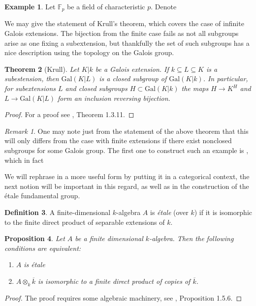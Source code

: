 \documentclass{article}
\newtheorem{theorem}{Theorem}[section]
\theoremstyle{definition}
\newtheorem{definition}[theorem]{Definition}
\newtheorem{example}[theorem]{Example}
\theoremstyle{remark}
\newtheorem*{remark}{Remark}
\theoremstyle{plain}
\newtheorem{proposition}[theorem]{Proposition}
\begin{document}
\begin{example}
	Let $\mathbb{F}_p$ be a field of characteristic $p$.
	Denote 

\end{example}
We may give the statement of Krull's theorem, which covers the case of infinite Galois extensions.
The bijection from the finite case fails as not all subgroups arise as one fixing a subextension, but thankfully the set of such subgroups has a nice description using the topology on the Galois group.
\begin{theorem}[Krull]
	Let $K | k$ be a Galois extension.
	If $k \subseteq L \subseteq K$ is a subestension, then $\text{Gal}(K|L)$ is a closed subgroup of $\text{Gal}(K|k)$.
	In particular, for subextensions $L$ and closed subgroups $H \subset \text{Gal}(K|k)$ the maps $H \to K^H$ and $L \to \text{Gal}(K|L)$ form an inclusion reversing bijection.
\end{theorem}

\begin{proof}
	For a proof see \cite{Szamuely}, Theorem 1.3.11. 
\end{proof}


\begin{remark}
	One may note just from the statement of the above theorem that this will only differs from the case with finite extensions if there exist nonclosed subgroups for some Galois group.
	The first one to construct such an example is , which in fact 
\end{remark}

We will rephrase  in a more useful form by putting it in a categorical context, the next notion will be important in this regard, as well as in the construction of the \'etale fundamental group.

\begin{definition} 
	A finite-dimensional $k$-algebra $A$ is \textit{\'etale} (over $k$) if it is isomorphic to the finite direct product of separable extensions of $k$.
\end{definition}

\begin{proposition} 
	Let $A$ be a finite dimensional $k$-algebra.
	Then the following conditions are equivalent:
	\begin{enumerate}
		\item $A$ is \'etale
		\item $A \otimes_k \overline{k}$ is isomorphic to a finite direct product of copies of $\overline{k}$.
	\end{enumerate}
\end{proposition}
\begin{proof}
	The proof requires some algebraic machinery, see \cite{Szamuely}, Proposition 1.5.6.
\end{proof}
\end{document}
